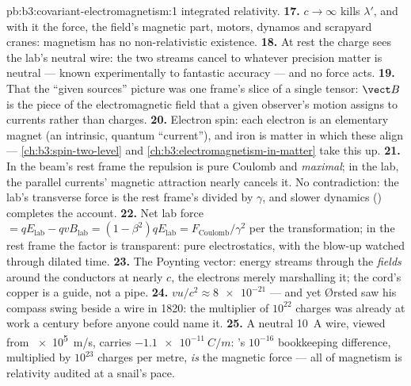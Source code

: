 \begin{solution}{pb:b3:covariant-electromagnetism:1}
integrated relativity.
\textbf{17.} $c \to \infty$ kills $\lambda'$, and with it the force,
the field's magnetic part, motors, dynamos and scrapyard cranes:
magnetism has no non-relativistic existence.
\textbf{18.} At rest the charge sees the lab's neutral wire: the two
streams cancel to whatever precision matter is neutral --- known
experimentally to fantastic accuracy --- and no force acts.
\textbf{19.} That the ``given sources'' picture was one frame's
slice of a single tensor: $\vect B$ is the piece of the
electromagnetic field that a given observer's motion assigns to
currents rather than charges.
\textbf{20.} Electron spin: each electron is an elementary magnet
(an intrinsic, quantum ``current''), and iron is matter in which
these align --- \cref{ch:b3:spin-two-level} and
\cref{ch:b3:electromagnetism-in-matter} take this up.
\textbf{21.} In the beam's rest frame the repulsion is pure Coulomb
and \emph{maximal}; in the lab, the parallel currents' magnetic
attraction nearly cancels it. No contradiction: the lab's transverse
force is the rest frame's divided by $\gamma$, and slower dynamics
() completes the account.
\textbf{22.} Net lab force $= qE_{\text{lab}} - qvB_{\text{lab}} =
(1 - \beta^2)qE_{\text{lab}} = F_{\text{Coulomb}}/\gamma^2$ per the
transformation; in the rest frame the factor is transparent: pure
electrostatics, with the blow-up watched through dilated time.
\textbf{23.} The Poynting vector: energy streams through the
\emph{fields} around the conductors at nearly $c$, the electrons
merely marshalling it; the cord's copper is a guide, not a pipe.
\textbf{24.} $vu/c^2 \approx \num{8e-21}$ --- and yet Ørsted saw
his compass swing beside a wire in 1820: the multiplier of
$10^{22}$ charges was already at work a century before anyone could
name it.
\textbf{25.} A neutral \qty{10}{A} wire, viewed from \qty{e5}{m/s},
carries $\qty{-1.1e-11}{C/m}$: 's $10^{-16}$
bookkeeping difference, multiplied by $10^{23}$ charges per metre,
\emph{is} the magnetic force --- all of magnetism is relativity
audited at a snail's pace.
\end{solution}
